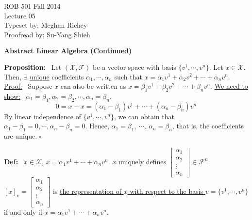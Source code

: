 \documentclass[letterpaper]{article}
\begin{document}
\baselineskip=48pt  %


\setlength{\parskip}{.3in}
\setlength{\itemsep}{.3in}

\pagestyle{plain}

{\Large \bf
\begin{center}
ROB 501 Fall 2014 \\
Lecture 05 \\
Typeset by: Meghan Richey \\
Proofread by: Su-Yang Shieh \\
\end{center}
}

\Large

\begin{center}
\textbf{Abstract Linear Algebra (Continued)}
\end{center}

\noindent \textbf{Proposition:}~ Let $(\mathcal{X}, \mathcal{F})$ be a vector space with basis $\{v^1, \dotsb, v^n\}$. Let $x\in\mathcal{X}$. Then, $\exists$ \underline{unique} coefficients $\alpha_1, \dotsb, \alpha_n$ such that $x=\alpha_{1}v^{1}+\alpha_{2}v^{2}+\dotsb+\alpha_{n}v^{n}$.
    \newline\newline
    \noindent \underline{Proof:}~ Suppose $x$ can also be written as $x=\beta_1v^1+\beta_2v^2+\dotsb+\beta_nv^n$.
    \newline
    \noindent \underline{We need to show:}~ $\alpha_{1}=\beta_{1},\alpha_{2}=\beta_{2},\dotsb,\alpha_{n}=\beta_{n}$.
    \begin{equation*}
        0=x-x=(\alpha_{1}-\beta_{1})v^{1}+\dotsb+(\alpha_{n}-\beta_{n})v^{n}
    \end{equation*}
    By linear independence of $\{v^{1}, \dotsb, v^{n}\}$, we can obtain that $\alpha_{1}-\beta_{1}=0,\dotsb,\alpha_{n}-\beta_{n}=0$.
    \newline
    Hence, $\alpha_1=\beta_1,\ \dotsb,\ \alpha_n=\beta_n$, that is, the coefficients are unique. $\square$

\noindent \textbf{Def:}~ $x\in \mathcal{X}$, $x=\alpha_1v^1+\dotsb+\alpha_nv^n$. $x$ uniquely defines                     $\begin{bmatrix}\alpha_{1}\\
            \alpha_{2}\\
            \vdots\\
            \alpha_{n}
    \end{bmatrix}\in\mathcal{F}^n$.
    \newline
    $[x]_v=
    \begin{bmatrix}\alpha_{1}\\
        \alpha_{2}\\
        \vdots\\
        \alpha_{n}
    \end{bmatrix}$ is \underline{the representation of $x$ with respect to the basis $v=\{v^1,\dotsb,v^n\}$} if and only if $x=\alpha_1v^1+\dotsb+\alpha_nv^n$.
\end{document}
